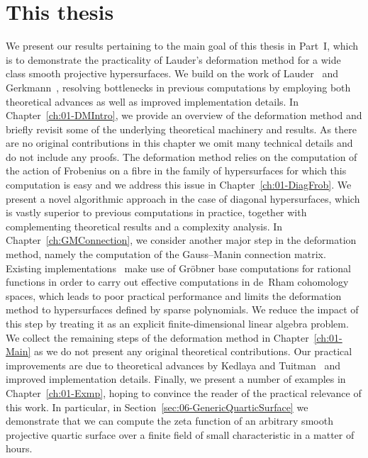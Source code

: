 \section{This thesis}

We present our results pertaining to the main goal of this thesis in 
Part~{I}, which is to demonstrate the practicality of Lauder's deformation 
method for a wide class smooth projective hypersurfaces.  We build on 
the work of Lauder~\citep{Lau04a} and Gerkmann~\citep{Gerkmann2007}, 
resolving bottlenecks in previous computations by employing both theoretical 
advances as well as improved implementation details.  
In Chapter~\ref{ch:01-DMIntro}, we provide an overview of the deformation 
method and briefly revisit some of the underlying theoretical machinery 
and results.  As there are no original contributions in this chapter we 
omit many technical details and do not include any proofs.  
The deformation method relies on the computation of the action of 
Frobenius on a fibre in the family of hypersurfaces for which 
this computation is easy and we address this issue in 
Chapter~\ref{ch:01-DiagFrob}.  We present 
a novel algorithmic approach in the case of diagonal hypersurfaces, 
which is vastly superior to previous computations in practice, together 
with complementing theoretical results and a complexity analysis.
In Chapter~\ref{ch:GMConnection}, we consider another major step in the 
deformation method, namely the computation of the Gauss--Manin connection 
matrix.  Existing implementations~\citep{Lau04a,Gerkmann2007,Kedlaya2011} 
make use of Gr\"obner base computations for rational functions in order 
to carry out effective computations in de~Rham cohomology spaces, which 
leads to poor practical performance and limits the deformation method to 
hypersurfaces defined by sparse polynomials.  We reduce the impact 
of this step by treating it as an explicit finite-dimensional linear 
algebra problem.  We collect the remaining steps of the deformation 
method in Chapter~\ref{ch:01-Main}  as we do not present any original 
theoretical contributions.  Our practical improvements are due to 
theoretical advances by Kedlaya and Tuitman~\citep{KedlayaTuitman2012} 
and improved implementation details.  Finally, we present a number of 
examples in Chapter~\ref{ch:01-Exmp}, hoping to convince the reader of 
the practical relevance of this work.  In particular, in 
Section~\ref{sec:06-GenericQuarticSurface} we demonstrate that we can 
compute the zeta function of an arbitrary smooth projective quartic 
surface over a finite field of small characteristic in a matter of hours.

